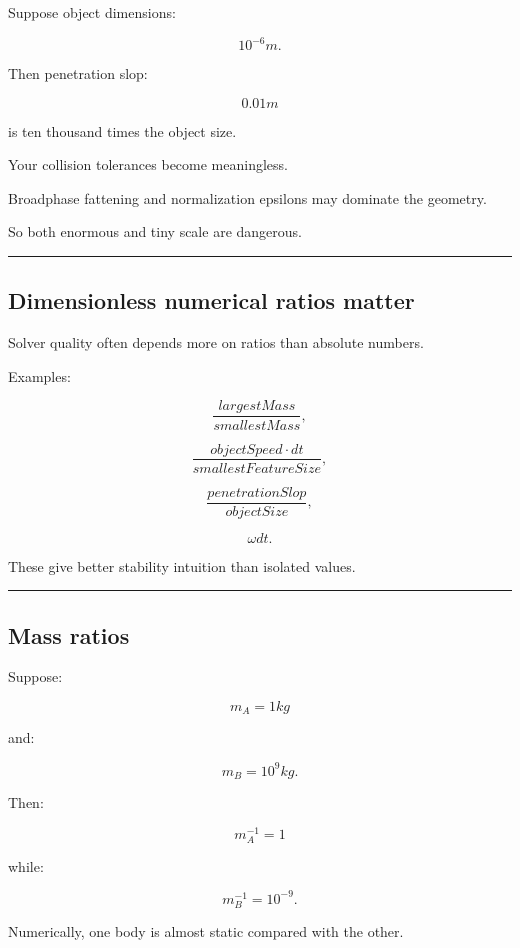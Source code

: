 Suppose object dimensions:

\[
10^{-6}m.
\]

Then penetration slop:

\[
0.01m
\]

is ten thousand times the object size.

Your collision tolerances become meaningless.

Broadphase fattening and normalization epsilons may dominate the geometry.

So both enormous and tiny scale are dangerous.

\begin{center}\rule{0.5\linewidth}{0.5pt}\end{center}

\subsection{Dimensionless numerical ratios matter}\label{06-engine-ii-ch039-dimensionless-numerical-ratios-matter}

Solver quality often depends more on ratios than absolute numbers.

Examples:

\[
\frac{largestMass}{smallestMass},
\]

\[
\frac{objectSpeed\cdot dt}{smallestFeatureSize},
\]

\[
\frac{penetrationSlop}{objectSize},
\]

\[
\omega dt.
\]

These give better stability intuition than isolated values.

\begin{center}\rule{0.5\linewidth}{0.5pt}\end{center}

\subsection{Mass ratios}\label{06-engine-ii-ch039-mass-ratios}

Suppose:

\[
m_A=1kg
\]

and:

\[
m_B=10^9kg.
\]

Then:

\[
m_A^{-1}=1
\]

while:

\[
m_B^{-1}=10^{-9}.
\]

Numerically, one body is almost static compared with the other.

